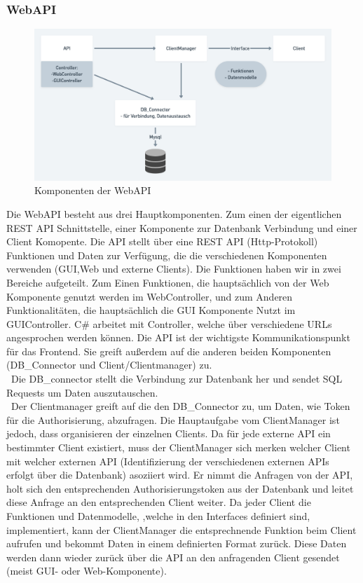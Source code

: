 \subsubsection{WebAPI}
\begin{figure}[h]
\centering
\includegraphics[width=120mm]{pictures/WebAPI.png}
\caption{Komponenten der WebAPI}
\end{figure}
Die WebAPI besteht aus drei Hauptkomponenten. Zum einen der eigentlichen REST API Schnittstelle, einer Komponente zur Datenbank Verbindung und einer Client Komopente. Die API stellt über eine REST API (Http-Protokoll) Funktionen und Daten zur Verfügung, die die verschiedenen Komponenten verwenden (GUI,Web und externe Clients). Die Funktionen haben wir in zwei Bereiche aufgeteilt. Zum Einen Funktionen, die hauptsächlich von der Web Komponente genutzt werden im WebController, und zum Anderen Funktionalitäten, die hauptsächlich die GUI Komponente Nutzt im GUIController. C\# arbeitet mit Controller, welche über verschiedene URLs angesprochen werden können. Die API ist der wichtigste Kommunikationspunkt für das Frontend. Sie greift außerdem auf die anderen beiden Komponenten (DB\_Connector und Client/Clientmanager) zu.\\\
Die DB\_connector stellt die Verbindung zur Datenbank her und sendet SQL Requests um Daten auszutauschen.\\\
Der Clientmanager greift auf die den DB\_Connector zu, um Daten, wie Token für die Authorisierung, abzufragen. Die Hauptaufgabe vom ClientManager ist jedoch, dass organisieren der einzelnen Clients. Da für jede externe API ein bestimmter Client existiert, muss der ClientManager sich merken welcher Client mit welcher externen API (Identifizierung der verschiedenen externen APIs erfolgt über die Datenbank) asoziiert wird. Er nimmt die Anfragen von der API, holt sich den entsprechenden Authorisierungstoken aus der Datenbank und leitet diese Anfrage an den entsprechenden Client weiter. Da jeder Client die Funktionen und Datenmodelle, ,welche in den Interfaces definiert sind, implementiert, kann der ClientManager die entsprechnende Funktion beim Client aufrufen und bekommt Daten in einem definierten Format zurück. Diese Daten werden dann wieder zurück über die API an den anfragenden Client gesendet (meist GUI- oder Web-Komponente).


